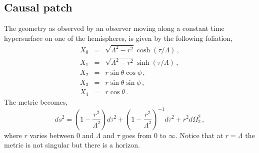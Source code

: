 \documentclass[a4paper,11pt]{article}
\numberwithin{equation}{section}
\begin{document}
\subsection*{Causal patch}
The geometry as observed by an observer moving along a constant time hypersurface on one of the hemispheres, is given by the following foliation,
\begin{eqnarray}
X_0&=&\sqrt{\Lambda^2-r^2}\cosh(\tau/\Lambda) \,, \label{foliation:causalpatch}\\
X_1&=&\sqrt{\Lambda^2-r^2}\sinh(\tau/\Lambda) \,, \nonumber\\
X_2&=&r\sin\theta\cos\phi \,, \nonumber\\
X_3&=&r\sin\theta\sin\phi \,, \nonumber\\
X_4&=&r\cos\theta \,.\nonumber
\end{eqnarray}
The metric becomes,
\begin{equation}
ds^2=\left(1-\frac{r^2}{\Lambda^2}\right)d\tau^2+\left(1-\frac{r^2}{\Lambda^2}\right)^{-1}d\tau^2+r^2d\Omega_2^2 \,,
\end{equation}
where $r$ varies between $0$ and $\Lambda$ and $\tau$ goes from $0$ to $\infty$. Notice that at $r=\Lambda$ the metric is not singular but there is a horizon.
\end{document}

